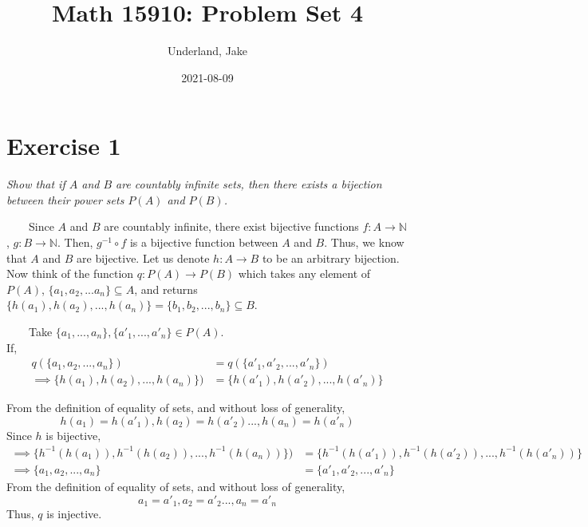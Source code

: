 \documentclass[
]{article}
\title{Math 15910: Problem Set 4}
\author{Underland, Jake}
\date{2021-08-09}
\begin{document}
\maketitle

{
\setcounter{tocdepth}{2}
\tableofcontents
}
\hypertarget{exercise-1}{%
\section{Exercise 1}\label{exercise-1}}

\emph{Show that if \(A\) and \(B\) are countably infinite sets, then
there exists a bijection between their power sets \(P(A)\) and
\(P(B)\).}

~~~~Since \(A\) and \(B\) are countably infinite, there exist bijective
functions \(f:A \to \mathbb{N}\), \(g:B \to \mathbb{N}\). Then,
\(g^{-1} \circ f\) is a bijective function between \(A\) and \(B\).
Thus, we know that \(A\) and \(B\) are bijective. Let us denote
\(h: A \to B\) to be an arbitrary bijection. Now think of the function
\(q: P(A) \to P(B)\) which takes any element of \(P(A)\),
\(\{a_1, a_2, ... a_n\} \subseteq A\), and returns
\(\{h(a_1), h(a_2), ... , h(a_n)\} = \{b_1, b_2, ..., b_n\} \subseteq B\).

~~~~Take \(\{a_1, ..., a_n\}, \{a'_1, ..., a'_n\} \in P(A)\).\\
If,\\
\[\begin{aligned} q(\{a_1, a_2, ..., a_n\}) &=  q(\{a'_1, a'_2,..., a'_n\}) \\ \implies \{h(a_1), h(a_2), ..., h(a_n)\}) &=  \{h(a'_1), h(a'_2),..., h(a'_n)\} \end{aligned}\]

From the definition of equality of sets, and without loss of
generality,\\
\[h(a_1) = h(a'_1), h(a_2) = h(a'_2) ..., h(a_n) = h(a'_n)\] Since \(h\)
is bijective,\\
\[ \begin{aligned} \implies \{h^{-1}(h(a_1)), h^{-1}(h(a_2)), ..., h^{-1}(h(a_n))\}) &=  \{h^{-1}(h(a'_1)), h^{-1}(h(a'_2)),..., h^{-1}(h(a'_n))\} \\ \implies \{a_1, a_2, ..., a_n\} &=  \{a'_1, a'_2,..., a'_n\} \end{aligned} \]
From the definition of equality of sets, and without loss of
generality,\\
\[a_1 = a'_1, a_2 = a'_2 ..., a_n = a'_n\] Thus, \(q\) is injective.
\end{document}
